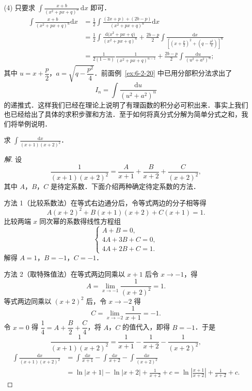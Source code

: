 (4) 只要求 $\displaystyle\int\frac{x+b}{\left(x^{2}+px+q\right)^{n}}\,\mathrm{d}x$ 即可．
\[
\begin{aligned}
\int\frac{x+b}{\left(x^{2}+px+q\right)^{n}}\mathrm{d}x
&= \frac{1}{2}\int\frac{(2x+p)+(2b-p)}{\left(x^{2}+px+q\right)^{n}}\mathrm{d}x\\
&= \frac{1}{2}\int\frac{\mathrm{d}\big(x^{2}+px+q\big)}{\left(x^{2}+px+q\right)^{n}}
+\frac{2b-p}{2}\int\frac{\mathrm{d}x}{\left[\left(x+\frac{p}{2}\right)^{2}+\left(q-\frac{p^{2}}{4}\right)\right]^{n}}\\
&= \frac{1}{2(1-n)}\frac{1}{\left(x^{2}+px+q\right)^{n-1}}
+\frac{2b-p}{2}\int\frac{\mathrm{d}u}{\left(u^{2}+a^{2}\right)^{n}};
\end{aligned}
\]
其中 $u = x+\dfrac{p}{2}$，$a = \sqrt{q-\dfrac{p^{2}}{4}}$．前面例~\ref{ex:6-2-20} 中已用分部积分法求出了
\[
I_{n} = \int\frac{\mathrm{d}u}{\left(u^{2}+a^{2}\right)^{n}}
\]
的递推式．这样我们已经在理论上说明了有理函数的积分必可积出来．事实上我们也已经给出了具体的求积步骤和方法．至于如何将真分式分解为简单分式之和，我们将举例说明．

\begin{example}\label{ex:6-2-21}
求 $\displaystyle\int\frac{\mathrm{d}x}{(x+1)(x+2)^{2}}$．
\end{example}

\begin{proof}[解]
设
\[
\frac{1}{(x+1)(x+2)^{2}} = \frac{A}{x+1}+\frac{B}{x+2}+\frac{C}{(x+2)^{2}},
\]
其中 $A$，$B$，$C$ 是待定系数．下面介绍两种确定待定系数的方法．

方法 1（比较系数法）\quad 在等式右边通分后，令等式两边的分子相等得
\[
A(x+2)^{2}+B(x+1)(x+2)+C(x+1) = 1.
\]
比较两端 $x$ 同次幂的系数得线性方程组
\[
\begin{cases}
A+B = 0,\\
4A+3B+C = 0,\\
4A+2B+C = 1.
\end{cases}
\]
解得 $A = 1$，$B = -1$，$C = -1$．

方法 2（取特殊值法）\quad 在等式两边同乘以 $x+1$ 后令 $x \to -1$，得
\[
A = \lim_{x\to-1}\frac{1}{(x+2)^{2}} = 1.
\]
等式两边同乘以 $(x+2)^{2}$ 后，令 $x \to -2$ 得
\[
C = \lim_{x\to-2}\frac{1}{x+1} = -1.
\]
令 $x = 0$ 得 $\dfrac{1}{4} = A+\dfrac{B}{2}+\dfrac{C}{4}$，将 $A$，$C$ 的值代入，即得 $B = -1$．于是
\[
\frac{1}{(x+1)(x+2)^{2}} = \frac{1}{x+1}-\frac{1}{x+2}-\frac{1}{(x+2)^{2}},
\]
\[
\begin{aligned}
\int\frac{\mathrm{d}x}{(x+1)(x+2)^{2}}
&= \int\frac{\mathrm{d}x}{x+1}-\int\frac{\mathrm{d}x}{x+2}-\int\frac{\mathrm{d}x}{(x+2)^{2}}\\
&= \ln|x+1|-\ln|x+2|+\frac{1}{x+2}+c
= \ln\left|\frac{x+1}{x+2}\right|+\frac{1}{x+2}+c.
\end{aligned}
\]
\end{proof}

